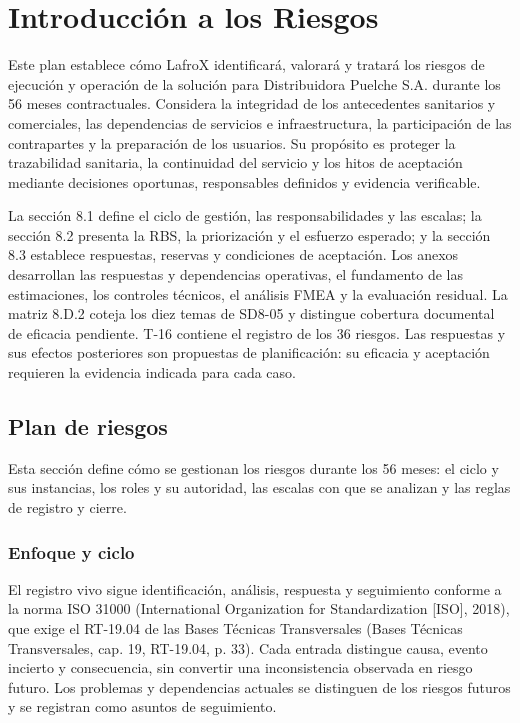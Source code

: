 \setcounter{chapter}{7}
\chapter{Introducción a los Riesgos}

Este plan establece cómo LafroX identificará, valorará y tratará los riesgos de ejecución y operación de la solución para Distribuidora Puelche S.A. durante los 56 meses contractuales. Considera la integridad de los antecedentes sanitarios y comerciales, las dependencias de servicios e infraestructura, la participación de las contrapartes y la preparación de los usuarios. Su propósito es proteger la trazabilidad sanitaria, la continuidad del servicio y los hitos de aceptación mediante decisiones oportunas, responsables definidos y evidencia verificable.

La sección 8.1 define el ciclo de gestión, las responsabilidades y las escalas; la sección 8.2 presenta la RBS, la priorización y el esfuerzo esperado; y la sección 8.3 establece respuestas, reservas y condiciones de aceptación. Los anexos desarrollan las respuestas y dependencias operativas, el fundamento de las estimaciones, los controles técnicos, el análisis FMEA y la evaluación residual. La matriz 8.D.2 coteja los diez temas de SD8-05 y distingue cobertura documental de eficacia pendiente. T-16 contiene el registro de los 36 riesgos. Las respuestas y sus efectos posteriores son propuestas de planificación: su eficacia y aceptación requieren la evidencia indicada para cada caso.

\section{Plan de riesgos}

Esta sección define cómo se gestionan los riesgos durante los 56 meses: el ciclo y sus instancias, los roles y su autoridad, las escalas con que se analizan y las reglas de registro y cierre.

\subsection{Enfoque y ciclo}

El registro vivo sigue identificación, análisis, respuesta y seguimiento conforme a la norma ISO 31000 (International Organization for Standardization [ISO], 2018), que exige el RT-19.04 de las Bases Técnicas Transversales (Bases Técnicas Transversales, cap. 19, RT-19.04, p. 33). Cada entrada distingue causa, evento incierto y consecuencia, sin convertir una inconsistencia observada en riesgo futuro. Los problemas y dependencias actuales se distinguen de los riesgos futuros y se registran como asuntos de seguimiento.

